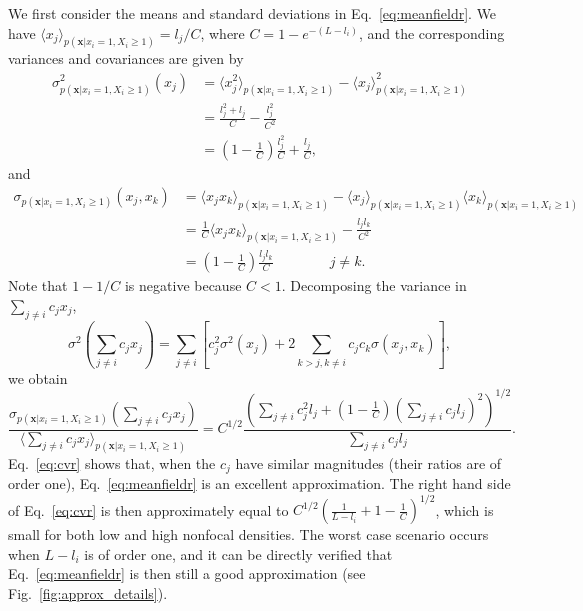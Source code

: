 \documentclass[12pt]{article}
\begin{document}
We first consider the means and standard deviations in Eq.~\eqref{eq:meanfieldr}. We have $\langle x_j \rangle_{p({\mathbf x}|x_i=1,X_i\geq 1)}=l_j/C$, where $C=1-e^{-(L-l_i)}$, and the corresponding variances and covariances are given by
\begin{align}
\sigma_{p({\mathbf x}|x_i=1,X_i\geq 1)}^2(x_j)&=\langle x_j^2 \rangle_{p({\mathbf x}|x_i=1,X_i\geq 1)}-\langle x_j \rangle_{p({\mathbf x}|x_i=1,X_i\geq 1)}^2\nonumber\\
&=\frac{l_j^2 + l_j}{C}-\frac{l_j^2}{C^2}\nonumber \\
&=\left(1-\frac{1}{C}\right)\frac{l_j^2}{C}+\frac{l_j}{C},\label{eq:varr}
\end{align}
and
\begin{align}
\sigma_{p({\mathbf x}|x_i=1,X_i\geq 1)}(x_j,x_k)&=\langle x_j x_k \rangle_{p({\mathbf x}|x_i=1,X_i\geq 1)}-\langle x_j \rangle_{p({\mathbf x}|x_i=1,X_i\geq 1)}\langle x_k \rangle_{p({\mathbf x}|x_i=1,X_i\geq 1)}\nonumber\\
&=\frac{1}{C}\langle x_j x_k \rangle_{p({\mathbf x}|x_i=1,X_i\geq 1)}-\frac{l_jl_k}{C^2}\nonumber\\
&=\left(1-\frac{1}{C}\right)\frac{l_j l_k}{C}\qquad\qquad j\neq k. \label{eq:covr}
\end{align} 
Note that $1-1/C$ is negative because $C<1$. Decomposing the variance in $\sum_{j\neq i} c_j x_j$,
\begin{equation}
\sigma^2(\sum_{j\neq i} c_j x_j)=\sum_{j\neq i}\left[c_j^2\sigma^2(x_j)+2\sum_{k>j, k\neq i}c_j c_k\sigma(x_j,x_k)\right],\label{eq:vartotr}
\end{equation}
we obtain 
\begin{equation}
\frac{\sigma_{p({\mathbf x}|x_i=1,X_i\geq 1)}(\sum_{j\neq i} c_j x_j)}{\langle\sum_{j\neq i} c_j x_j\rangle_{p({\mathbf x}|x_i=1,X_i\geq 1)}}=C^{1/2}\frac{\left(\sum_{j\neq i}c_j^2 l_j+(1-\frac{1}{C})\left(\sum_{j\neq i}c_j l_j\right)^2 \right)^{1/2}}{\sum_{j\neq i}c_j l_j}. \label{eq:cvr}
\end{equation}
Eq.~\eqref{eq:cvr} shows that, when the $c_j$ have similar magnitudes (their ratios are of order one), Eq.~\eqref{eq:meanfieldr} is an excellent approximation. The right hand side of Eq.~\eqref{eq:cvr} is then approximately equal to $C^{1/2}\left(\frac{1}{L-l_i}+1-\frac{1}{C}\right)^{1/2}$, which is small for both low and high nonfocal densities. The worst case scenario occurs when $L-l_i$ is of order one, and it can be directly verified that Eq.~\eqref{eq:meanfieldr} is then still a good approximation (see Fig.~\ref{fig:approx_details}). 
\end{document}
